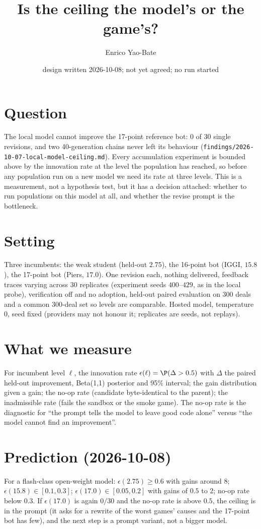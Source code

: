 \documentclass[11pt]{article}
\title{Is the ceiling the model's or the game's?}
\author{Enrico Yao-Bate}
\date{design written 2026-10-08; not yet agreed; no run started}
\begin{document}
\maketitle

\section{Question}
The local model cannot improve the 17-point reference bot: 0 of 30 single revisions, and two 40-generation
chains never left its behaviour (\texttt{findings/2026-10-07-local-model-ceiling.md}). Every accumulation
experiment is bounded above by the innovation rate at the level the population has reached, so before any
population run on a new model we need its rate at three levels. This is a measurement, not a hypothesis test,
but it has a decision attached: whether to run populations on this model at all, and whether the revise prompt
is the bottleneck.

\section{Setting}
Three incumbents: the weak student (held-out $2.75$), the 16-point bot (IGGI, $15.8$), the 17-point bot
(Piers, $17.0$). One revision each, nothing delivered, feedback traces varying across 30 replicates (experiment
seeds $400$--$429$, as in the local probe), verification off and no adoption, held-out paired evaluation on 300
deals and a common 300-deal set so levels are comparable. Hosted model, temperature 0, seed fixed (providers may
not honour it; replicates are seeds, not replays).

\section{What we measure}
For incumbent level $\ell$, the innovation rate $\epsilon(\ell)=\P(\Delta>0.5)$ with $\Delta$ the paired
held-out improvement, Beta(1,1) posterior and 95\% interval; the gain distribution given a gain; the no-op
rate (candidate byte-identical to the parent); the inadmissible rate (fails the sandbox or the smoke game).
The no-op rate is the diagnostic for ``the prompt tells the model to leave good code alone'' versus ``the model
cannot find an improvement''.

\section{Prediction (2026-10-08)}
For a flash-class open-weight model: $\epsilon(2.75)\ge 0.6$ with gains around $8$; $\epsilon(15.8)\in[0.1,0.3]$;
$\epsilon(17.0)\in[0.05,0.2]$ with gains of $0.5$ to $2$; no-op rate below $0.3$. If $\epsilon(17.0)$ is again
$0/30$ and the no-op rate is above $0.5$, the ceiling is in the prompt (it asks for a rewrite of the worst games'
causes and the 17-point bot has few), and the next step is a prompt variant, not a bigger model.
\end{document}
